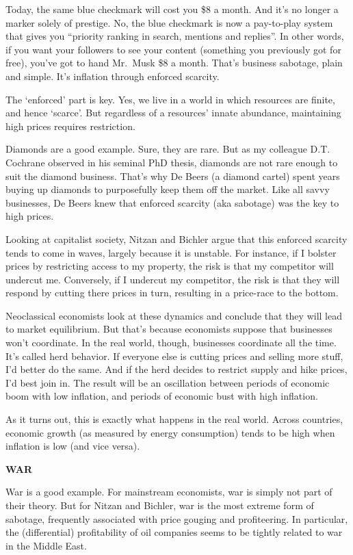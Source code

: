 \documentclass[
]{book}
\begin{document}
Today, the same blue checkmark will cost you \$8 a month. And it's no longer a marker solely of prestige. No, the blue checkmark is now a pay-to-play system that gives you ``priority ranking in search, mentions and replies''. In other words, if you want your followers to see your content (something you previously got for free), you've got to hand Mr.~Musk \$8 a month. That's business sabotage, plain and simple. It's inflation through enforced scarcity.

The `enforced' part is key. Yes, we live in a world in which resources are finite, and hence `scarce'. But regardless of a resources' innate abundance, maintaining high prices requires restriction.

Diamonds are a good example. Sure, they are rare. But as my colleague D.T. Cochrane observed in his seminal PhD thesis, diamonds are not rare enough to suit the diamond business. That's why De Beers (a diamond cartel) spent years buying up diamonds to purposefully keep them off the market. Like all savvy businesses, De Beers knew that enforced scarcity (aka sabotage) was the key to high prices.

Looking at capitalist society, Nitzan and Bichler argue that this enforced scarcity tends to come in waves, largely because it is unstable. For instance, if I bolster prices by restricting access to my property, the risk is that my competitor will undercut me. Conversely, if I undercut my competitor, the risk is that they will respond by cutting there prices in turn, resulting in a price-race to the bottom.

Neoclassical economists look at these dynamics and conclude that they will lead to market equilibrium. But that's because economists suppose that businesses won't coordinate. In the real world, though, businesses coordinate all the time. It's called herd behavior. If everyone else is cutting prices and selling more stuff, I'd better do the same. And if the herd decides to restrict supply and hike prices, I'd best join in. The result will be an oscillation between periods of economic boom with low inflation, and periods of economic bust with high inflation.

As it turns out, this is exactly what happens in the real world. Across countries, economic growth (as measured by energy consumption) tends to be high when inflation is low (and vice versa).

\textbf{WAR}

War is a good example. For mainstream economists, war is simply not part of their theory. But for Nitzan and Bichler, war is the most extreme form of sabotage, frequently associated with price gouging and profiteering. In particular, the (differential) profitability of oil companies seems to be tightly related to war in the Middle East.
\end{document}
